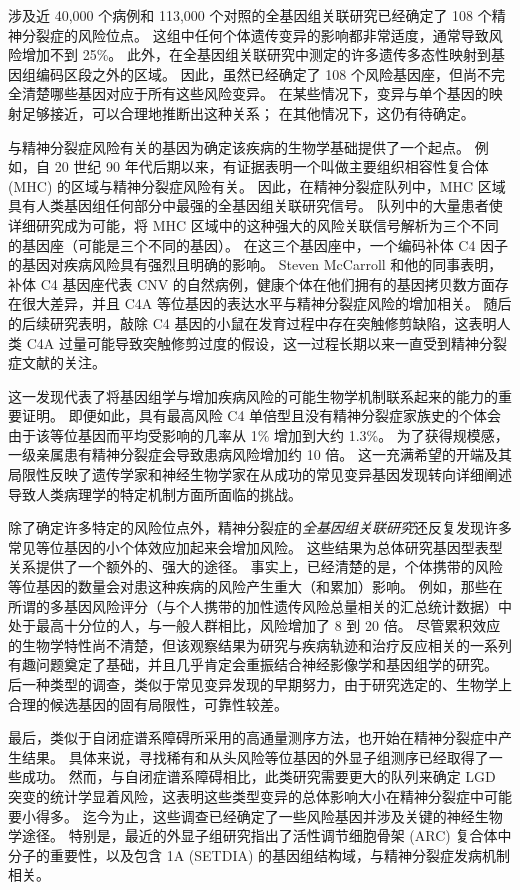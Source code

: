 涉及近 40,000 个病例和 113,000 个对照的全基因组关联研究已经确定了 108 个精神分裂症的风险位点。 
这组中任何个体遗传变异的影响都非常适度，通常导致风险增加不到 25\%。 
此外，在全基因组关联研究中测定的许多遗传多态性映射到基因组编码区段之外的区域。 因此，虽然已经确定了 108 个风险基因座，但尚不完全清楚哪些基因对应于所有这些风险变异。 
在某些情况下，变异与单个基因的映射足够接近，可以合理地推断出这种关系； 在其他情况下，这仍有待确定。


与精神分裂症风险有关的基因为确定该疾病的生物学基础提供了一个起点。 
例如，自 20 世纪 90 年代后期以来，有证据表明一个叫做主要组织相容性复合体 (MHC) 的区域与精神分裂症风险有关。 
因此，在精神分裂症队列中，MHC 区域具有人类基因组任何部分中最强的全基因组关联研究信号。 
队列中的大量患者使详细研究成为可能，将 MHC 区域中的这种强大的风险关联信号解析为三个不同的基因座（可能是三个不同的基因）。 
在这三个基因座中，一个编码补体 C4 因子的基因对疾病风险具有强烈且明确的影响。 
Steven McCarroll 和他的同事表明，补体 C4 基因座代表 CNV 的自然病例，健康个体在他们拥有的基因拷贝数方面存在很大差异，并且 C4A 等位基因的表达水平与精神分裂症风险的增加相关。 
随后的后续研究表明，敲除 C4 基因的小鼠在发育过程中存在突触修剪缺陷，这表明人类 C4A 过量可能导致突触修剪过度的假设，这一过程长期以来一直受到精神分裂症文献的关注。


这一发现代表了将基因组学与增加疾病风险的可能生物学机制联系起来的能力的重要证明。 
即便如此，具有最高风险 C4 单倍型且没有精神分裂症家族史的个体会由于该等位基因而平均受影响的几率从 1\% 增加到大约 1.3\%。 
为了获得规模感，一级亲属患有精神分裂症会导致患病风险增加约 10 倍。 
这一充满希望的开端及其局限性反映了遗传学家和神经生物学家在从成功的常见变异基因发现转向详细阐述导致人类病理学的特定机制方面所面临的挑战。


除了确定许多特定的风险位点外，精神分裂症的\textit{全基因组关联研究}还反复发现许多常见等位基因的小个体效应加起来会增加风险。 
这些结果为总体研究基因型表型关系提供了一个额外的、强大的途径。 
事实上，已经清楚的是，个体携带的风险等位基因的数量会对患这种疾病的风险产生重大（和累加）影响。 
例如，那些在所谓的多基因风险评分（与个人携带的加性遗传风险总量相关的汇总统计数据）中处于最高十分位的人，与一般人群相比，风险增加了 8 到 20 倍。 
尽管累积效应的生物学特性尚不清楚，但该观察结果为研究与疾病轨迹和治疗反应相关的一系列有趣问题奠定了基础，并且几乎肯定会重振结合神经影像学和基因组学的研究。 
后一种类型的调查，类似于常见变异发现的早期努力，由于研究选定的、生物学上合理的候选基因的固有局限性，可靠性较差。


最后，类似于自闭症谱系障碍所采用的高通量测序方法，也开始在精神分裂症中产生结果。 
具体来说，寻找稀有和从头风险等位基因的外显子组测序已经取得了一些成功。 
然而，与自闭症谱系障碍相比，此类研究需要更大的队列来确定 LGD 突变的统计学显着风险，这表明这些类型变异的总体影响大小在精神分裂症中可能要小得多。 
迄今为止，这些调查已经确定了一些风险基因并涉及关键的神经生物学途径。 
特别是，最近的外显子组研究指出了活性调节细胞骨架 (ARC) 复合体中分子的重要性，以及包含 1A (SETDIA) 的基因组结构域，与精神分裂症发病机制相关。



